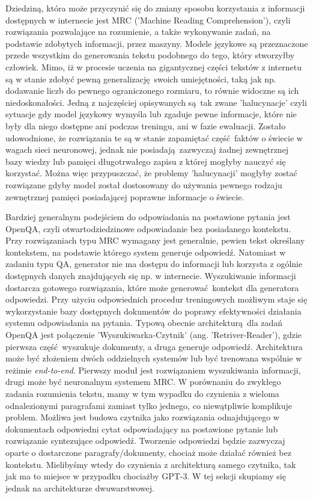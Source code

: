 Dziedziną, która może przyczynić się do zmiany sposobu korzystania z informacji dostępnych w internecie jest MRC ('Machine Reading Comprehension'), czyli rozwiązania pozwalające na rozumienie, a także wykonywanie zadań, na podstawie zdobytych informacji, przez maszyny. Modele językowe są przeznaczone przede wszystkim do generowania tekstu podobnego do tego, który stworzyłby człowiek. Mimo, iż w procesie uczenia na gigantycznej części tekstów z internetu są w stanie zdobyć pewną generalizację swoich umiejętności, taką jak np. dodawanie liczb do pewnego ograniczonego rozmiaru, to równie widoczne są ich niedoskonałości. Jedną z najczęściej opisywanych są tak zwane 'halucynacje' czyli sytuacje gdy model językowy wymyśla lub zgaduje pewne informacje, które nie były dla niego dostępne ani podczas treningu, ani w fazie ewaluacji. Zostało udowodnione, że rozwiązania te są w stanie zapamiętać część faktów o świecie w wagach sieci neuronowej, jednak nie posiadają zazwyczaj żadnej zewnętrznej bazy wiedzy lub pamięci długotrwałego zapisu z której mogłyby nauczyć się korzystać. Można więc przypuszczać, że problemy 'halucynacji' mogłyby zostać rozwiązane gdyby model został dostosowany do używania pewnego rodzaju zewnętrznej pamięci posiadającej poprawne informacje o świecie.\newline

Bardziej generalnym podejściem do odpowiadania na postawione pytania jest OpenQA, czyli otwartodziedzinowe odpowiadanie bez posiadanego kontekstu. Przy rozwiązaniach typu MRC wymagany jest generalnie, pewien tekst określany kontekstem, na podstawie którego system generuje odpowiedź. Natomiast w zadaniu typu QA, generator nie ma dostępu do informacji lub korzysta z ogólnie dostępnych danych znajdujących się np. w internecie. Wyszukiwanie informacji dostarcza gotowego rozwiązania, które może generować kontekst dla generatora odpowiedzi. Przy użyciu odpowiednich procedur treningowych możliwym staje się wykorzystanie bazy dostępnych dokumentów do poprawy efektywności działania systemu odpowiadania na pytania. Typową obecnie architekturą dla zadań OpenQA jest połączenie 'Wyszukiwarka-Czytnik' (ang. 'Retriver-Reader'), gdzie pierwsza część wyszukuje dokumenty, a druga generuje odpowiedź. Architektura może być złożeniem dwóch oddzielnych systemów lub być trenowana wspólnie w reżimie \emph{end-to-end}. Pierwszy moduł jest rozwiązaniem wyszukiwania informacji, drugi może być neuronalnym systemem MRC.\autocite{zhu2021retrieving} W porównaniu do zwykłego zadania rozumienia tekstu, mamy w tym wypadku do czynienia z wieloma odnalezionymi paragrafami zamiast tylko jednego, co niewątpliwie komplikuje problem. Możliwa jest budowa czytnika jako rozwiązania odnajdującego w dokumentach odpowiedni cytat odpowiadający na postawione pytanie lub rozwiązanie syntezujące odpowiedź. Tworzenie odpowiedzi będzie zazwyczaj oparte o dostarczone paragrafy/dokumenty, chociaż może działać również bez kontekstu. Mielibyśmy wtedy do czynienia z architekturą samego czytnika, tak jak ma to miejsce w przypadku chociażby GPT-3. \autocite{zhu2021retrieving} W tej sekcji skupiamy się jednak na architekturze dwuwarstwowej.
 
